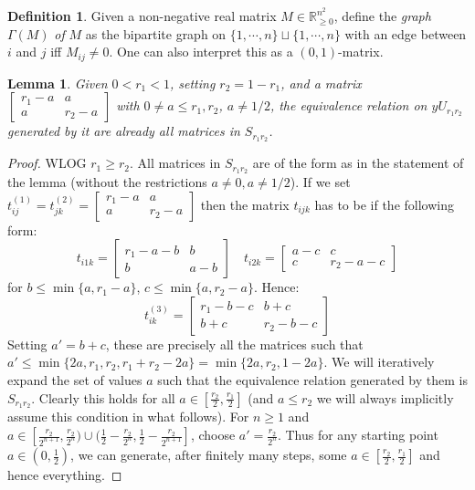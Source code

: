 \documentclass[a4paper]{amsproc}
\theoremstyle{plain}
\newtheorem{lemma}[theorem]{Lemma}
\theoremstyle{definition}
\newtheorem{definition}[theorem]{Definition}
\theoremstyle{remark}
\numberwithin{equation}{section}
\begin{document}
\begin{definition} Given a non-negative real matrix $M\in \mathbb{R}^{n^2}_{\geq 0}$, define the \emph{graph }$\Gamma(M)$\emph{ of }$M$ as the bipartite graph on $\{1, \cdots, n\}\sqcup \{1, \cdots, n\}$ with an edge between $i$ and $j$ iff $M_{ij}\neq 0$. One can also interpret this as a $(0,1)$-matrix.
\end{definition}
\begin{lemma}\label{2x2x2} Given $0<r_1<1$, setting $r_2=1-r_1$, and  a matrix $\begin{bmatrix}
r_1-a & a\\
a &r_2-a
\end{bmatrix}$ with $0\neq a \leq r_1,r_2$, $a\neq 1/2$, the equivalence relation on $yU_{r_1 r_2}$ generated by it are already all matrices in $S_{r_1r_2}$.
\end{lemma}
\begin{proof} WLOG $r_1\geq r_2$. All matrices in $S_{r_1r_2}$ are of the form as in the statement of the lemma (without the restrictions $a\neq 0,a\neq  1/2$). If we set $t^{(1)}_{ij}=t^{(2)}_{jk}=\begin{bmatrix}
r_1-a & a\\
a &r_2-a
\end{bmatrix}$ then the matrix $t_{ijk}$ has to be if the following form:
\[t_{i1k}=\begin{bmatrix}
r_1-a-b & b\\
b & a-b
\end{bmatrix} \quad t_{i2k}=\begin{bmatrix}
a-c & c\\
c & r_2-a-c
\end{bmatrix}\]
for $b\leq \min \{a, r_1-a \}$, $c\leq \min \{a,r_2-a\}$. Hence:
\[ t_{ik}^{(3)}=\begin{bmatrix}
r_1-b-c &b+ c\\
b+c & r_2-b-c
\end{bmatrix}
\]
Setting $a'=b+c$, these are precisely all the matrices such that $a'\leq \min\{2a, r_1, r_2, r_1+r_2-2a   \}=\min \{2a,r_2, 1-2a \}$. We will iteratively expand the set of  values $a$ such that the equivalence relation generated by them is $S_{r_1r_2}$.
Clearly this holds for all $a\in [\frac{r_2}{2},\frac{ r_1}{2}  ]$ (and $a\leq r_2$ we will always implicitly assume this condition in what follows).\newline
\indent For $n\geq 1$ and $a\in [\frac{r_2}{2^{n+1}},\frac{r_2}{2^n})\cup (\frac{1}{2}-\frac{r_2}{2^n}, \frac{1}{2}-\frac{r_2}{2^{n+1}}] $, choose $a'=\frac{r_2}{2^n}$. Thus for any starting point $a\in (0,\frac{1}{2})$, we can generate, after finitely many steps, some $a\in  [\frac{r_2}{2},\frac{ r_1}{2}  ]$ and hence everything.
\end{proof}
\end{document}
